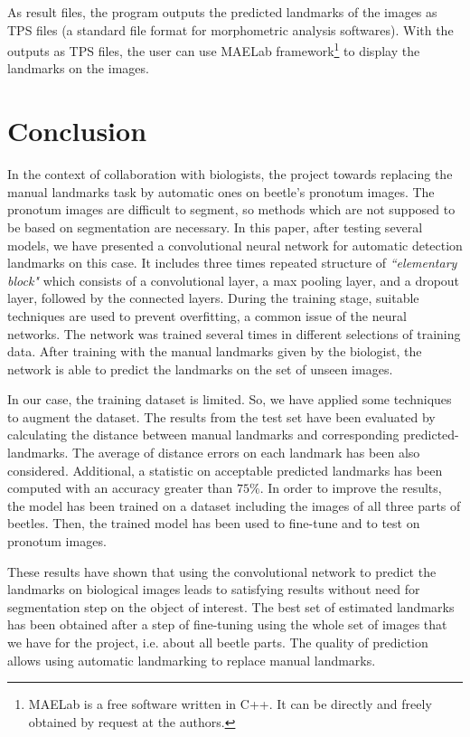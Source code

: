 \documentclass{article} %
\begin{document}
\begin{multicols}{2}
As result files, the program outputs the
predicted landmarks of the images as TPS files (a standard file format for morphometric analysis softwares). With the outputs as TPS files,
the user can use MAELab framework\footnote{MAELab is a free software written in C++. It can be directly and freely
obtained by request at the authors.} to display the
landmarks on the images.

\section{Conclusion}
\label{Secconclusion}
In the context of collaboration with biologists, the project towards replacing the manual landmarks task by automatic ones on beetle's pronotum images. The pronotum images are difficult to segment, so methods which are not supposed to be based on segmentation are necessary. In this paper, after testing several models, we have presented a convolutional neural network for automatic detection landmarks on this case. It includes three times repeated structure of \textit{``elementary block"} which consists of a convolutional layer, a max pooling layer, and a dropout layer, followed by the connected layers. During the training stage, suitable techniques are used to prevent overfitting, a common issue of the neural networks. The network was trained several times in different selections of training data. After training with the manual landmarks given by the biologist, the network is able to predict the landmarks on the set of unseen images.

In our case, the training dataset is limited. So, we have applied some techniques to augment the dataset. The results from the test set have been evaluated by calculating the distance between manual landmarks and corresponding predicted-landmarks. The average of distance errors on each landmark has been also considered. Additional, a statistic on acceptable predicted landmarks has been computed with an accuracy greater than $75\%$. In order to improve the results, the model has been trained on a dataset including the images of all three parts of beetles. Then, the trained model has been used to fine-tune and to test on pronotum images.

These results have shown that using the convolutional network to predict the
landmarks on biological images leads to satisfying results without need for segmentation step on the object of interest. The
best set of estimated landmarks has been obtained after a step
of fine-tuning using the whole set of images that we have for the
project, i.e. about all beetle parts. The quality of prediction allows using automatic landmarking to replace manual landmarks. 


\end{multicols}
\end{document}
